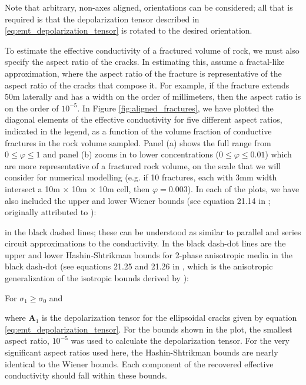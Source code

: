 
Note that arbitrary, non-axes aligned, orientations can be considered; all that is required is that the depolarization tensor described in \ref{eq:emt_depolarization_tensor} is rotated to the desired orientation.

To estimate the effective conductivity of a fractured volume of rock, we must also specify the aspect ratio of the cracks. In estimating this, assume a fractal-like approximation, where the aspect ratio of the fracture is representative of the aspect ratio of the cracks that compose it. For example, if the fracture extends 50m laterally and has a width on the order of millimeters, then the aspect ratio is on the order of $10^{-5}$. In Figure \ref{fig:aligned_fractures}, we have plotted the diagonal elements of the effective conductivity for five different aspect ratios, indicated in the legend, as a function of the volume fraction of conductive fractures in the rock volume sampled. Panel (a) shows the full range from $0 \leq \varphi \leq 1$ and panel (b) zooms in to lower concentrations ($0 \leq \varphi \leq 0.01$) which are more representative of a fractured rock volume, on the scale that we will consider for numerical modelling (e.g. if 10 fractures, each with 3mm width intersect a 10m $\times$ 10m $\times$ 10m cell, then $\varphi = 0.003$). In each of the plots, we have also included the upper and lower Wiener bounds (see equation 21.14 in \cite{Torquato2002}; originally attributed to \cite{Wiener1912}):


in the black dashed lines; these can be understood as similar to parallel and series circuit approximations to the conductivity. In the black dash-dot lines are the upper and lower Hashin-Shtrikman bounds for 2-phase anisotropic media in the black dash-dot (see equations 21.25 and 21.26 in \cite{Torquato2002}, which is the anisotropic generalization of the isotropic bounds derived by \cite{Hashin1962}):


For $\sigma_1 \geq \sigma_0$ and


where $\mathbf{A}_1$ is the depolarization tensor for the ellipsoidal cracks given by equation \ref{eq:emt_depolarization_tensor}. For the bounds shown in the plot, the smallest aspect ratio, $10^{-5}$ was used to calculate the depolarization tensor. For the very significant aspect ratios used here, the Hashin-Shtrikman bounds are nearly identical to the Wiener bounds. Each component of the recovered effective conductivity should fall within these bounds.

